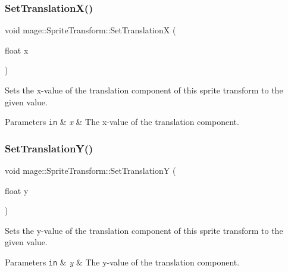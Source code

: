 \subsubsection{\texorpdfstring{Set\+Translation\+X()}{SetTranslationX()}}
{\footnotesize\ttfamily void mage\+::\+Sprite\+Transform\+::\+Set\+TranslationX (\begin{DoxyParamCaption}\item[{float}]{x }\end{DoxyParamCaption})\hspace{0.3cm}{\ttfamily [noexcept]}}

Sets the x-\/value of the translation component of this sprite transform to the given value.


\begin{DoxyParams}[1]{Parameters}
\mbox{\tt in}  & {\em x} & The x-\/value of the translation component. \\
\hline
\end{DoxyParams}
\hypertarget{structmage_1_1_sprite_transform_a3fd0f953867861c937380571caee65f3}{}\label{structmage_1_1_sprite_transform_a3fd0f953867861c937380571caee65f3} 
\subsubsection{\texorpdfstring{Set\+Translation\+Y()}{SetTranslationY()}}
{\footnotesize\ttfamily void mage\+::\+Sprite\+Transform\+::\+Set\+TranslationY (\begin{DoxyParamCaption}\item[{float}]{y }\end{DoxyParamCaption})\hspace{0.3cm}{\ttfamily [noexcept]}}

Sets the y-\/value of the translation component of this sprite transform to the given value.


\begin{DoxyParams}[1]{Parameters}
\mbox{\tt in}  & {\em y} & The y-\/value of the translation component. \\
\hline
\end{DoxyParams}
\hypertarget{structmage_1_1_sprite_transform_a92ae51f7dbf034d119625f70aa7fad1c}{}\label{structmage_1_1_sprite_transform_a92ae51f7dbf034d119625f70aa7fad1c} 
